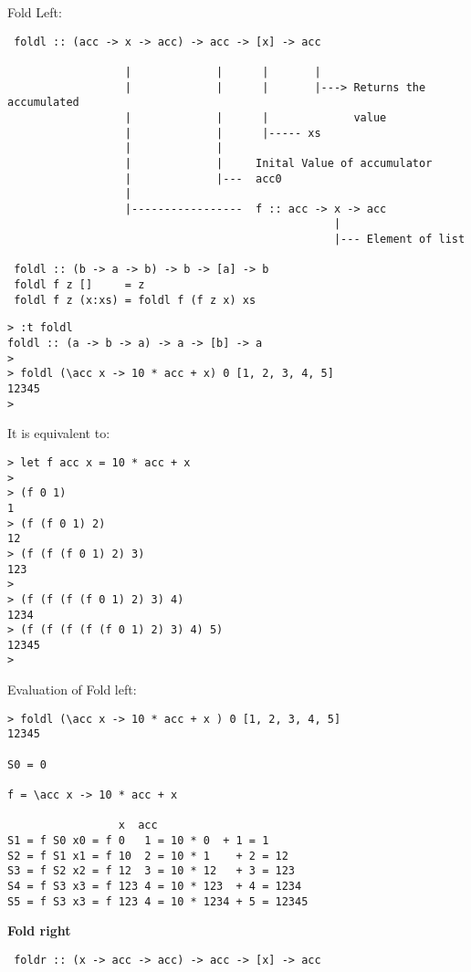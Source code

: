\documentclass[11pt]{article}
\begin{document}
\begin{enumerate}
Fold Left:

\begin{verbatim}
 foldl :: (acc -> x -> acc) -> acc -> [x] -> acc
 
                  |             |      |       | 
                  |             |      |       |---> Returns the accumulated 
                  |             |      |             value
                  |             |      |----- xs 
                  |             |                  
                  |             |     Inital Value of accumulator
                  |             |---  acc0
                  |
                  |-----------------  f :: acc -> x -> acc
                                                  |
                                                  |--- Element of list 

 foldl :: (b -> a -> b) -> b -> [a] -> b
 foldl f z []     = z
 foldl f z (x:xs) = foldl f (f z x) xs
\end{verbatim}


\begin{verbatim}
> :t foldl
foldl :: (a -> b -> a) -> a -> [b] -> a
> 
> foldl (\acc x -> 10 * acc + x) 0 [1, 2, 3, 4, 5] 
12345
>
\end{verbatim}

It is equivalent to:

\begin{verbatim}
> let f acc x = 10 * acc + x
> 
> (f 0 1)
1
> (f (f 0 1) 2)
12
> (f (f (f 0 1) 2) 3)
123
> 
> (f (f (f (f 0 1) 2) 3) 4)
1234
> (f (f (f (f (f 0 1) 2) 3) 4) 5)
12345
>
\end{verbatim}

Evaluation of Fold left:


\begin{verbatim}
> foldl (\acc x -> 10 * acc + x ) 0 [1, 2, 3, 4, 5]
12345

S0 = 0

f = \acc x -> 10 * acc + x

                 x  acc
S1 = f S0 x0 = f 0   1 = 10 * 0  + 1 = 1
S2 = f S1 x1 = f 10  2 = 10 * 1    + 2 = 12
S3 = f S2 x2 = f 12  3 = 10 * 12   + 3 = 123
S4 = f S3 x3 = f 123 4 = 10 * 123  + 4 = 1234
S5 = f S3 x3 = f 123 4 = 10 * 1234 + 5 = 12345
\end{verbatim}



\textbf{Fold right}

\begin{verbatim}
 foldr :: (x -> acc -> acc) -> acc -> [x] -> acc


\end{verbatim}
\end{enumerate}
\end{document}
